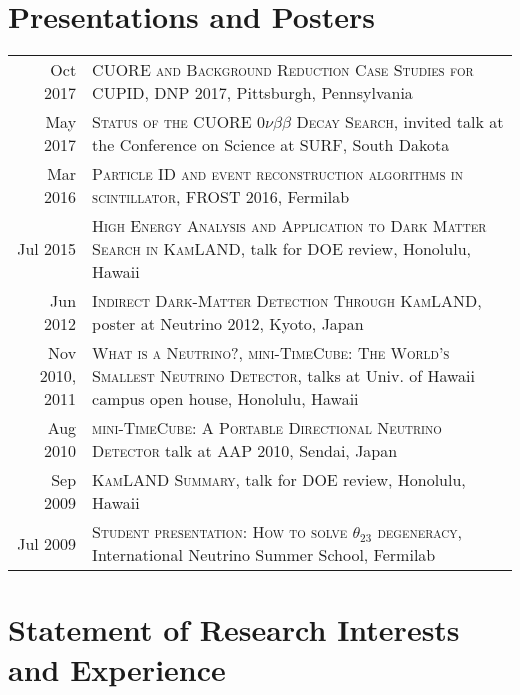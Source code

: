 \documentclass[a4paper,10pt]{article} %
\begin{document}
\section{Presentations and Posters}
\begin{tabular}{rp{11cm}}
	Oct 2017 & \textsc{CUORE and Background Reduction Case Studies for CUPID},
	DNP 2017, Pittsburgh, Pennsylvania \\
	May 2017 & \textsc{Status of the CUORE $0\nu\beta\beta$ Decay Search},
	invited talk at the Conference on Science at SURF, South Dakota \\
	Mar 2016 & \textsc{Particle ID and event reconstruction algorithms in
	scintillator},
	FROST 2016, Fermilab \\
	Jul 2015 & \textsc{High Energy Analysis and Application to Dark Matter
	Search in KamLAND}, talk for DOE review, Honolulu, Hawaii \\
	Jun 2012 & \textsc{Indirect Dark-Matter Detection Through KamLAND}, poster
	at Neutrino 2012, Kyoto, Japan \\
	Nov 2010, 2011 & \textsc{What is a Neutrino?}, \textsc{mini-TimeCube: The
	World's Smallest Neutrino Detector}, talks at Univ. of Hawaii campus open
	house, Honolulu, Hawaii \\
	Aug 2010 & \textsc{mini-TimeCube: A Portable Directional Neutrino Detector}
	talk at AAP 2010, Sendai, Japan \\
	Sep 2009 & \textsc{KamLAND Summary}, talk for DOE review, Honolulu,
	Hawaii \\
	Jul 2009 & \textsc{Student presentation: How to solve $\theta_{23}$
	degeneracy}, International Neutrino Summer School, Fermilab \\
	
\end{tabular}


\section{Statement of Research Interests and Experience}
\end{document}
